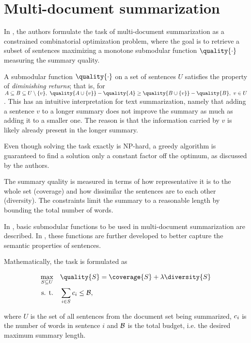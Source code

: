 \section{Multi-document summarization}
In \cite{multi-summarization-1}, the authors formulate the task of multi-document summarization as a constrained combinatorial optimization problem, where the goal is to retrieve a subset of sentences maximizing a monotone submodular function $\quality{\cdot}$ measuring the summary quality.

A submodular function $\quality{\cdot}$ on a set of sentences $U$ satisfies the property of \textit{diminishing returns}; that is, for $A \subseteq B \subseteq U \setminus \{ v \},\ \quality{A \cup \{ v \}} - \quality{A} \geq \quality{B \cup \{ v \}} - \quality{B},\ v \in U$. This has an intuitive interpretation for text summarization, namely that adding a sentence $v$ to a longer summary does not improve the summary as much as adding it to a smaller one. The reason is that the information carried by $v$ is likely already present in the longer summary.

Even though solving the task exactly is NP-hard, a greedy algorithm is guaranteed to find a solution only a constant factor off the optimum, as discussed by the authors.

The summary quality is measured in terms of how representative it is to the whole set (coverage) and how dissimilar the sentences are to each other (diversity). The constraints limit the summary to a reasonable length by bounding the total number of words.

In \cite{multi-summarization-1}, basic submodular functions to be used in multi-document summarization are described. In \cite{multi-summarization-2}, these functions are further developed to better capture the semantic properties of sentences.

Mathematically, the task is formulated as

\begin{equation}
\begin{alignedat}{-1}
\max_{S \subseteq U} & \quad \quality{S} = \coverage{S} + \lambda \diversity{S} \\
\text{s. t.} & \quad \sum_{i \in S}{\sentcost_{i}} \leq \budget,
\end{alignedat}
\end{equation}

where $U$ is the set of all sentences from the document set being summarized, $c_{i}$ is the number of words in sentence $i$ and $\mathcal{B}$ is the total budget, i.e. the desired maximum summary length.


